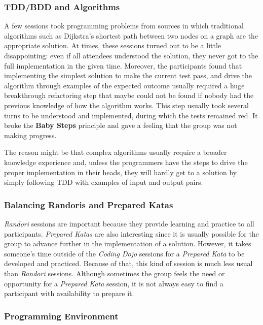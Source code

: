 \subsubsection{TDD/BDD and Algorithms}

A few sessions took programming problems from sources in which
traditional algorithms such as Dijkstra's shortest path between two
nodes on a graph are the appropriate solution. At times, these
sessions turned out to be a little disappointing: even if all
attendees understood the solution, they never got to the full
implementation in the given time. Moreover, the participants found
that implementing the simplest solution to make the current test pass,
and drive the algorithm through examples of the expected outcome
usually required a huge breakthrough refactoring step that maybe could
not be found if nobody had the previous knowledge of how the algorithm
works. This step usually took several turns to be understood and
implemented, during which the tests remained red. It broke the
\textbf{Baby Steps} principle and gave a feeling that the group was not making
progress.

The reason might be that complex algorithms usually require a broader
knowledge experience and, unless the programmers have the steps to
drive the proper implementation in their heads, they will hardly get
to a solution by simply following TDD with examples of input and
output pairs.

\subsubsection{Balancing Randoris and Prepared Katas}

\emph{Randori} sessions are important because they provide
learning and practice to all participants. \emph{Prepared Katas} are
also interesting since it is usually possible for the group to advance
further in the implementation of a solution. However, it takes
someone's time outside of the \emph{Coding Dojo} sessions for a
\emph{Prepared Kata} to be developed and practiced. Because of that,
this kind of session is much less usual than \emph{Randori} sessions.
Although sometimes the group feels the need or opportunity for a
\emph{Prepared Kata} session, it is not always easy to find a participant
with availability to prepare it.

\subsubsection{Programming Environment}

